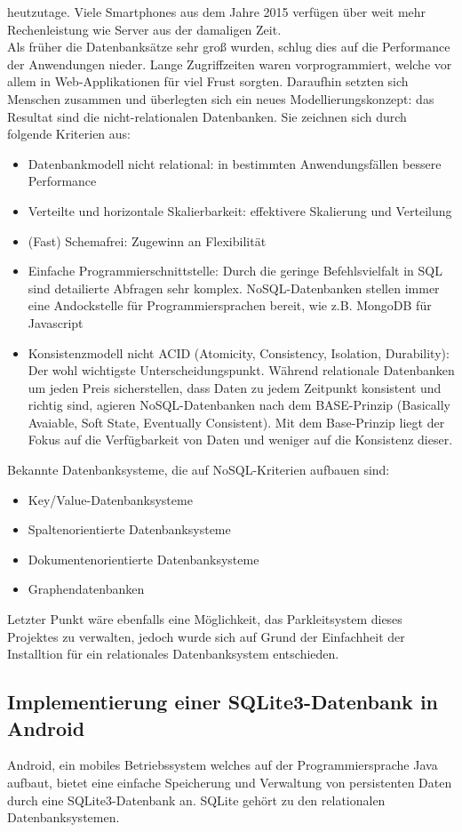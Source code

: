 \documentclass[11pt]{article}
\begin{document}
\begin{onehalfspacing}
heutzutage. Viele Smartphones aus dem Jahre 2015 verfügen über weit mehr
Rechenleistung wie Server aus der damaligen Zeit. \\
Als früher die Datenbanksätze sehr groß wurden, schlug dies auf die Performance
der Anwendungen nieder. Lange Zugriffzeiten waren vorprogrammiert, welche vor
allem in Web-Applikationen für viel Frust sorgten. Daraufhin setzten sich
Menschen zusammen und überlegten sich ein neues Modellierungskonzept: das
Resultat sind die nicht-relationalen Datenbanken. Sie zeichnen sich durch
folgende Kriterien aus:
\begin{itemize}
  \item Datenbankmodell nicht relational: in bestimmten Anwendungsfällen bessere
  Performance
  \item Verteilte und horizontale Skalierbarkeit: effektivere Skalierung und
  Verteilung
  \item (Fast) Schemafrei: Zugewinn an Flexibilität
  \item Einfache Programmierschnittstelle: Durch die geringe Befehlsvielfalt in
  SQL sind detailierte Abfragen sehr komplex. NoSQL-Datenbanken stellen immer
  eine Andockstelle für Programmiersprachen bereit, wie z.B. MongoDB für
  Javascript
  \item Konsistenzmodell nicht ACID (Atomicity, Consistency, Isolation,
  Durability): Der wohl wichtigste Unterscheidungspunkt. Während relationale
  Datenbanken um jeden Preis sicherstellen, dass Daten zu jedem Zeitpunkt
  konsistent und richtig sind, agieren NoSQL-Datenbanken nach dem BASE-Prinzip
  (Basically Avaiable, Soft State, Eventually Consistent). Mit dem Base-Prinzip
  liegt der Fokus auf die Verfügbarkeit von Daten und weniger auf die Konsistenz
  dieser.
\end{itemize}
Bekannte Datenbanksysteme, die auf NoSQL-Kriterien aufbauen sind:
\begin{itemize}
  \item Key/Value-Datenbanksysteme
  \item Spaltenorientierte Datenbanksysteme
  \item Dokumentenorientierte Datenbanksysteme
  \item Graphendatenbanken
\end{itemize}
Letzter Punkt wäre ebenfalls eine Möglichkeit, das Parkleitsystem dieses
Projektes zu verwalten, jedoch wurde sich auf Grund der Einfachheit der
Installtion für ein relationales Datenbanksystem entschieden.
\subsection{Implementierung einer SQLite3-Datenbank in Android}
Android, ein mobiles Betriebssystem welches auf der Programmiersprache Java
aufbaut, bietet eine einfache Speicherung und Verwaltung von persistenten Daten
durch eine SQLite3-Datenbank an. SQLite gehört zu den relationalen
Datenbanksystemen. \\


\end{onehalfspacing}
\end{document}
